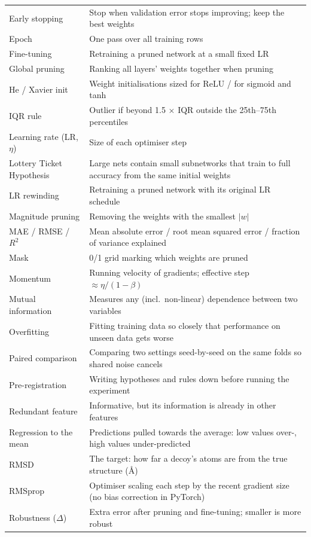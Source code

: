 \documentclass[11pt,a4paper]{article}
\begin{document}
\begin{xltabular}{\linewidth}{@{}>{\raggedright\arraybackslash}p{4.2cm}Y@{}}
Early stopping & Stop when validation error stops improving; keep the best weights \\
Epoch & One pass over all training rows \\
Fine-tuning & Retraining a pruned network at a small fixed LR \\
Global pruning & Ranking all layers' weights together when pruning \\
He / Xavier init & Weight initialisations sized for ReLU / for sigmoid and tanh \\
IQR rule & Outlier if beyond 1.5 $\times$ IQR outside the 25th--75th percentiles \\
Learning rate (LR, $\eta$) & Size of each optimiser step \\
Lottery Ticket Hypothesis & Large nets contain small subnetworks that train to full accuracy from the same initial weights \\
LR rewinding & Retraining a pruned network with its original LR schedule \\
Magnitude pruning & Removing the weights with the smallest $|w|$ \\
MAE / RMSE / $R^2$ & Mean absolute error / root mean squared error / fraction of variance explained \\
Mask & 0/1 grid marking which weights are pruned \\
Momentum & Running velocity of gradients; effective step $\approx \eta/(1-\beta)$ \\
Mutual information & Measures any (incl.\ non-linear) dependence between two variables \\
Overfitting & Fitting training data so closely that performance on unseen data gets worse \\
Paired comparison & Comparing two settings seed-by-seed on the same folds so shared noise cancels \\
Pre-registration & Writing hypotheses and rules down before running the experiment \\
Redundant feature & Informative, but its information is already in other features \\
Regression to the mean & Predictions pulled towards the average: low values over-, high values under-predicted \\
RMSD & The target: how far a decoy's atoms are from the true structure (\AA) \\
RMSprop & Optimiser scaling each step by the recent gradient size (no bias correction in PyTorch) \\
Robustness ($\Delta$) & Extra error after pruning and fine-tuning; smaller is more robust \\

\end{xltabular}
\end{document}
